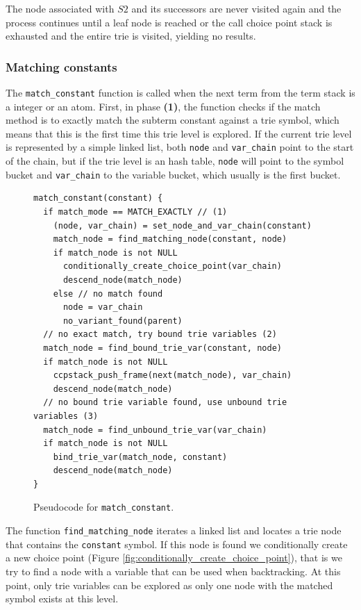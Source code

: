 The node associated with $S2$ and its successors are never visited again and
the process continues until a leaf node is reached or the call choice point stack
is exhausted and the entire trie is visited, yielding no results.

\subsubsection{Matching constants}

The \texttt{match\_constant} function is called when the next term from the term stack is a integer or an
atom. First, in phase \textbf{(1)}, the function checks if the match method is to exactly match the
subterm constant against a trie symbol, which means
that this is the first time this trie level is explored. If the current trie level is represented by a simple
linked list, both \texttt{node} and \texttt{var\_chain} point to the start of the chain, but if the trie level
is an hash table, \texttt{node} will point to the symbol bucket and \texttt{var\_chain} to the variable
bucket, which usually is the first bucket.

\begin{figure}[h]
\begin{Verbatim}[fontsize=\small]
match_constant(constant) {
  if match_mode == MATCH_EXACTLY // (1)
    (node, var_chain) = set_node_and_var_chain(constant)
    match_node = find_matching_node(constant, node)
    if match_node is not NULL
      conditionally_create_choice_point(var_chain)
      descend_node(match_node)
    else // no match found
      node = var_chain
      no_variant_found(parent)
  // no exact match, try bound trie variables (2)
  match_node = find_bound_trie_var(constant, node)
  if match_node is not NULL
    ccpstack_push_frame(next(match_node), var_chain)
    descend_node(match_node)
  // no bound trie variable found, use unbound trie variables (3)
  match_node = find_unbound_trie_var(var_chain)
  if match_node is not NULL
    bind_trie_var(match_node, constant)
    descend_node(match_node)
}
\end{Verbatim}
\caption{Pseudo\-code for \texttt{match\_constant}.}
\label{fig:match_constant}
\end{figure}

The function \texttt{find\_matching\_node} iterates a linked list and locates a trie node that contains the
\texttt{constant} symbol. If this node is found we conditionally create a
new choice point (Figure \ref{fig:conditionally_create_choice_point}), that is
we try to find a node with a variable that can be used when backtracking. At this point, only
trie variables can be explored as only one node with the matched symbol exists at this level.

